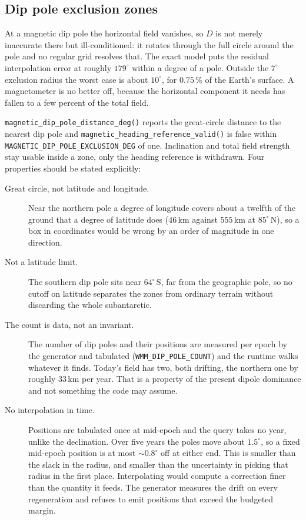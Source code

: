 \documentclass[11pt,a4paper]{article}
\newcommand{\code}[1]{\texttt{#1}}
\begin{document}
\subsection{Dip pole exclusion zones}
\label{sec:wmm-dipzone}

At a magnetic dip pole the horizontal field vanishes, so $D$ is not
merely inaccurate there but ill-conditioned: it rotates through the full
circle around the pole and no regular grid resolves that. The exact
model puts the residual interpolation error at roughly $179^\circ$
within a degree of a pole. Outside the $7^\circ$ exclusion radius the
worst case is about $10^\circ$, for $0.75\,\%$ of the Earth's surface. A
magnetometer is no better off, because the horizontal component it needs
has fallen to a few percent of the total field.

\code{magnetic\_\allowbreak{}dip\_\allowbreak{}pole\_\allowbreak{}distance\_\allowbreak{}deg()} reports the
great-circle distance to the nearest dip pole and
\code{magnetic\_\allowbreak{}heading\_\allowbreak{}reference\_\allowbreak{}valid()} is false within
\code{MAGNETIC\_\allowbreak{}DIP\_\allowbreak{}POLE\_\allowbreak{}EXCLUSION\_\allowbreak{}DEG} of one. Inclination
and total field strength stay usable inside a zone, only the heading
reference is withdrawn. Four properties should be stated explicitly:

\begin{description}
  \item[Great circle, not latitude and longitude.] Near the northern
    pole a degree of longitude covers about a twelfth of the ground that a
    degree of latitude does ($46$\,km against $555$\,km at
    $85^\circ$\,N), so a box in coordinates would be wrong by an order
    of magnitude in one direction.
  \item[Not a latitude limit.] The southern dip pole sits near
    $64^\circ$\,S, far from the geographic pole, so no cutoff on
    latitude separates the zones from ordinary terrain without
    discarding the whole subantarctic.
  \item[The count is data, not an invariant.] The number of dip poles
    and their positions are measured per epoch by the generator and
    tabulated (\code{WMM\_\allowbreak{}DIP\_\allowbreak{}POLE\_\allowbreak{}COUNT}) and the runtime
    walks whatever it finds. Today's field has two, both drifting, the
    northern one by roughly $33$\,km per year. That is a property of the
    present dipole dominance and not something the code may assume.
  \item[No interpolation in time.] Positions are tabulated once at
    mid-epoch and the query takes no year, unlike the declination. Over
    five years the poles move about $1.5^\circ$, so a fixed mid-epoch
    position is at most $\sim0.8^\circ$ off at either end. This is smaller
    than the slack in the radius, and smaller than the uncertainty in
    picking that radius in the first place. Interpolating would compute
    a correction finer than the quantity it feeds. The generator
    measures the drift on every regeneration and refuses to emit
    positions that exceed the budgeted margin.
\end{description}
\end{document}
